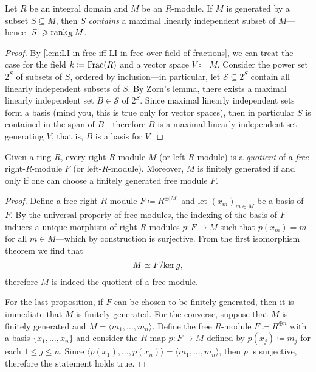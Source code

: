 \begin{proposition}
\label{prop:generating-set-contains-maximal-LI}
Let \(R\) be an integral domain and \(M\) be an \(R\)-module. If \(M\) is
generated by a subset \(S \subseteq M\), then \(S\) \emph{contains} a maximal
linearly independent subset of \(M\)---hence \(|S| \geqslant \operatorname{rank}_R M\).
\end{proposition}

\begin{proof}
By \cref{lem:LI-in-free-iff-LI-in-free-over-field-of-fractions}, we can treat
the case for the field \(k \coloneq \operatorname{Frac}(R)\) and a vector space
\(V \coloneq M\). Consider the power set \(2^S\) of subsets of \(S\), ordered by
inclusion---in particular, let \(\mathcal{S} \subseteq 2^S\) contain all
linearly independent subsets of \(S\). By Zorn's lemma, there exists a maximal
linearly independent set \(B \in \mathcal{S}\) of \(2^S\). Since maximal
linearly independent sets form a basis (mind you, this is true only for vector
spaces), then in particular \(S\) is contained in the span of \(B\)---therefore
\(B\) is a maximal linearly independent set generating \(V\), that is, \(B\) is
a basis for \(V\).
\end{proof}

\begin{theorem}
\label{thm:any-module-is-quotient-of-free-module}
Given a ring \(R\), every right-\(R\)-module \(M\) (or left-\(R\)-module) is a
\emph{quotient} of a \emph{free} right-\(R\)-module \(F\) (or
left-\(R\)-module). Moreover, \(M\) is finitely generated if and only if one can
choose a finitely generated free module \(F\).
\end{theorem}

\begin{proof}
Define a free right-\(R\)-module \(F \coloneq R^{\oplus |M|}\) and let
\((x_m)_{m \in M}\) be a basis of \(F\). By the universal property of
free modules, the indexing of the basis of \(F\) induces a unique morphism of
right-\(R\)-modules \(p: F \to M\) such that \(p(x_m) = m\) for all \(m \in
M\)---which by construction is surjective. From the first isomorphism theorem we
find that
\[
M \simeq F/{\ker g},
\]
therefore \(M\) is indeed the quotient of a free module.

For the last proposition, if \(F\) can be chosen to be finitely generated, then
it is immediate that \(M\) is finitely generated. For the converse, suppose that
\(M\) is finitely generated and \(M = \langle m_1, \dots, m_n \rangle\). Define
the free \(R\)-module \(F \coloneq R^{\oplus n}\) with a basis
\(\{x_1, \dots, x_n\}\) and consider the \(R\)-map \(p: F \to M\) defined by
\(p(x_j) \coloneq m_j\) for each \(1 \leq j \leq n\). Since \(\langle p(x_1),
\dots, p(x_n) \rangle = \langle m_1, \dots, m_n \rangle\), then \(p\) is
surjective, therefore the statement holds true.
\end{proof}

